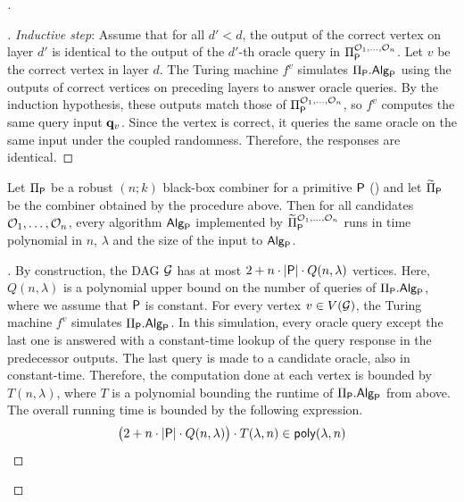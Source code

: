 \begin{proof}[]
\begin{proof}[]
		\textit{Inductive step}: Assume that for all $d' < d$, the output of the correct vertex on layer
		$d'$ is identical to the output of the $d'$-th oracle query in $\BBComb{P}[\O_1, \ldots, \O_n]$.
		Let $v$ be the correct vertex in layer $d$. The Turing machine $f^v$ simulates $\BBComb{P}.\alg{Alg}{P}$
		using the outputs of correct vertices on preceding layers to answer oracle queries. 
		By the induction hypothesis, these outputs match those of $\BBComb{P}[\O_1, \ldots, \O_n]$,
		so $f^v$ computes the same query input $\mathbf{q}_v$. Since the vertex is correct, it queries the same oracle on the same input under the coupled randomness.
		Therefore, the responses are identical.
	\end{proof}

	\begin{claim}\label{claim:time_dag_comb}
		Let $\BBComb{P}$ be a robust $(n;k)$ black-box combiner for a primitive $ \textup{\textsf{P}} $ ()
		and let $\DAGComb{P}$ be the combiner obtained by the procedure above. Then for all candidates $\mathcal{O}_1, \ldots, \mathcal{O}_n$,
		every algorithm $\alg{Alg}{P}$ implemented by $\DAGComb{P}[\O_1, \ldots, \O_n]$
		runs in time polynomial in $n$, $\lambda$ and the size of the input to $\alg{Alg}{P}$.
	\end{claim}

	\begin{proof}[]
		By construction, the DAG $\mathcal{G}$ has at most $2 + n \cdot | \textup{\textsf{P}} | \cdot Q(n,\lambda)$ vertices.
		Here, $Q(n,\lambda)$ is a polynomial upper bound on the number of queries of $\BBComb{P}.\alg{Alg}{P}$, where 
		we assume that $ \textup{\textsf{P}} $ is constant.
		For every vertex $v \in V(\mathcal{G})$, the Turing machine $f^v$ simulates $\BBComb{P}.\alg{Alg}{P}$.
		In this simulation, every oracle query except the last one is answered with a constant-time lookup of the query response
		in the predecessor outputs. The last query is made to a candidate oracle, also in constant-time.
		Therefore, the computation done at each vertex is bounded by $T(n,\lambda)$, where $T$
		is a polynomial bounding the runtime of $\BBComb{P}.\alg{Alg}{P}$ from above.
		The overall running time is bounded by the following expression.
		\[
			\bigl(2 + n\cdot|\prim{P}| \cdot Q(n,\lambda)\bigr) \cdot T(\lambda, n) \in \poly[\lambda, n]
		\]
	\end{proof}


\end{proof}
